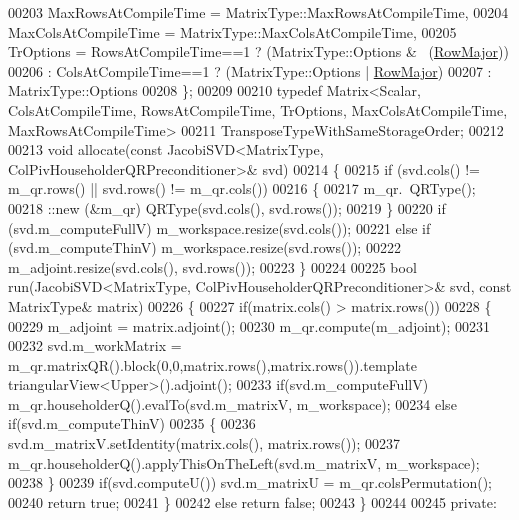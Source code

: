 \begin{DoxyCode}
00203     MaxRowsAtCompileTime = MatrixType::MaxRowsAtCompileTime,
00204     MaxColsAtCompileTime = MatrixType::MaxColsAtCompileTime,
00205     TrOptions = RowsAtCompileTime==1 ? (MatrixType::Options & ~(\hyperlink{group__enums_ggaacded1a18ae58b0f554751f6cdf9eb13acfcde9cd8677c5f7caf6bd603666aae3}{RowMajor}))
00206               : ColsAtCompileTime==1 ? (MatrixType::Options |   \hyperlink{group__enums_ggaacded1a18ae58b0f554751f6cdf9eb13acfcde9cd8677c5f7caf6bd603666aae3}{RowMajor})
00207               : MatrixType::Options
00208   \};
00209 
00210   \textcolor{keyword}{typedef} Matrix<Scalar, ColsAtCompileTime, RowsAtCompileTime, TrOptions, MaxColsAtCompileTime,
       MaxRowsAtCompileTime>
00211           TransposeTypeWithSameStorageOrder;
00212 
00213   \textcolor{keywordtype}{void} allocate(\textcolor{keyword}{const} JacobiSVD<MatrixType, ColPivHouseholderQRPreconditioner>& svd)
00214   \{
00215     \textcolor{keywordflow}{if} (svd.cols() != m\_qr.rows() || svd.rows() != m\_qr.cols())
00216     \{
00217       m\_qr.~QRType();
00218       ::new (&m\_qr) QRType(svd.cols(), svd.rows());
00219     \}
00220     \textcolor{keywordflow}{if} (svd.m\_computeFullV) m\_workspace.resize(svd.cols());
00221     \textcolor{keywordflow}{else} \textcolor{keywordflow}{if} (svd.m\_computeThinV) m\_workspace.resize(svd.rows());
00222     m\_adjoint.resize(svd.cols(), svd.rows());
00223   \}
00224 
00225   \textcolor{keywordtype}{bool} run(JacobiSVD<MatrixType, ColPivHouseholderQRPreconditioner>& svd, \textcolor{keyword}{const} MatrixType& matrix)
00226   \{
00227     \textcolor{keywordflow}{if}(matrix.cols() > matrix.rows())
00228     \{
00229       m\_adjoint = matrix.adjoint();
00230       m\_qr.compute(m\_adjoint);
00231 
00232       svd.m\_workMatrix = m\_qr.matrixQR().block(0,0,matrix.rows(),matrix.rows()).\textcolor{keyword}{template} 
      triangularView<Upper>().adjoint();
00233       \textcolor{keywordflow}{if}(svd.m\_computeFullV) m\_qr.householderQ().evalTo(svd.m\_matrixV, m\_workspace);
00234       \textcolor{keywordflow}{else} \textcolor{keywordflow}{if}(svd.m\_computeThinV)
00235       \{
00236         svd.m\_matrixV.setIdentity(matrix.cols(), matrix.rows());
00237         m\_qr.householderQ().applyThisOnTheLeft(svd.m\_matrixV, m\_workspace);
00238       \}
00239       \textcolor{keywordflow}{if}(svd.computeU()) svd.m\_matrixU = m\_qr.colsPermutation();
00240       \textcolor{keywordflow}{return} \textcolor{keyword}{true};
00241     \}
00242     \textcolor{keywordflow}{else} \textcolor{keywordflow}{return} \textcolor{keyword}{false};
00243   \}
00244 
00245 \textcolor{keyword}{private}:

\end{DoxyCode}
